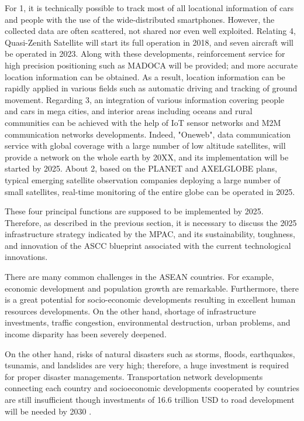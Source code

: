 For 1, it is technically possible to track most of all locational information of cars and people with the use of the wide-distributed smartphones. However, the collected data are often scattered, not shared nor even well exploited. Relating 4, Quasi-Zenith Satellite will start its full operation in 2018, and seven aircraft will be operated in 2023. Along with these developments, reinforcement service for high precision positioning such as MADOCA will be provided; and more accurate location information can be obtained. As a result, location information can be rapidly applied in various fields such as automatic driving and tracking of ground movement. Regarding 3, an integration of various information covering people and cars in mega cities, and interior areas including oceans and rural communities can be achieved with the help of IoT sensor networks and M2M communication networks developments. Indeed, "Oneweb", data communication service with global coverage with a large number of low altitude satellites, will provide a network on the whole earth by 20XX, and its implementation will be started by 2025. About 2, based on the PLANET and AXELGLOBE plans, typical emerging satellite observation companies deploying a large number of small satellites, real-time monitoring of the entire globe can be operated in 2025.

\vspace{0.4 cm}

These four principal functions are supposed to be implemented by 2025. Therefore, as described in the previous section, it is necessary to discuss the 2025 infrastructure strategy indicated by the MPAC, and its sustainability, toughness, and innovation of the ASCC blueprint associated with the current technological innovations.

\vspace{0.4 cm}

There are many common challenges in the ASEAN countries. For example, economic development and population growth are remarkable. Furthermore, there is a great potential for socio-economic developments resulting in excellent human resources developments. On the other hand, shortage of infrastructure investments, traffic congestion, environmental destruction, urban problems, and income disparity has been severely deepened.

\vspace{0.4 cm}

On the other hand, risks of natural disasters such as storms, floods, earthquakes, tsunamis, and landslides are very high; therefore, a huge investment is required for proper disaster managements. Transportation network developments connecting each country and socioeconomic developments cooperated by countries are still insufficient though investments of 16.6 trillion USD to road development will be needed by 2030 \cite{Dobbs2013}.

